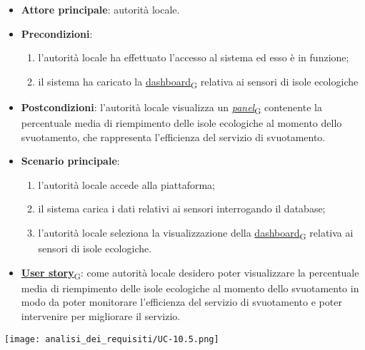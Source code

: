 \newpage

\begin{itemize}
	\item \textbf{Attore principale}: autorità locale.
	\item \textbf{Precondizioni}:
	      \begin{enumerate}
		      \item l'autorità locale ha effettuato l'accesso al sistema ed esso è in funzione;
		      \item il sistema ha caricato la \href{https://7last.github.io/docs/rtb/documentazione-interna/glossario\#dashboard}{dashboard\textsubscript{G}} relativa ai sensori di isole ecologiche
	      \end{enumerate}
	\item \textbf{Postcondizioni}: l'autorità locale visualizza un \href{https://7last.github.io/docs/rtb/documentazione-interna/glossario\#panel}{\textit{panel}\textsubscript{G}} contenente la percentuale media di riempimento delle isole ecologiche al momento dello svuotamento,
	      che rappresenta l'efficienza del servizio di svuotamento.
	\item \textbf{Scenario principale}:
	      \begin{enumerate}
		      \item l'autorità locale accede alla piattaforma;
		      \item il sistema carica i dati relativi ai sensori interrogando il database;
		      \item l'autorità locale seleziona la visualizzazione della \href{https://7last.github.io/docs/rtb/documentazione-interna/glossario\#dashboard}{dashboard\textsubscript{G}} relativa ai sensori di isole ecologiche.
	      \end{enumerate}
	\item \href{https://7last.github.io/docs/rtb/documentazione-interna/glossario\#user-story}{\textbf{User story}\textsubscript{G}}:
	      come autorità locale desidero poter visualizzare la percentuale media di riempimento delle isole ecologiche al momento dello svuotamento in modo da poter monitorare
	      l'efficienza del servizio di svuotamento e poter intervenire per migliorare il servizio.
\end{itemize}
\begin{center}
	\texttt{[image: analisi\_dei\_requisiti/UC-10.5.png]}
\end{center}

